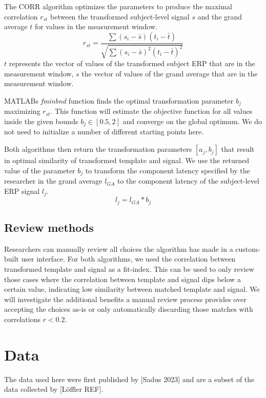 \documentclass[
  man,floatsintext]{apa7}
\begin{document}
The CORR algorithm optimizes the parameters to produce the maximal correlation \(r_{st}\) between the transformed subject-level signal \(s\) and the grand average \(t\) for values in the measurement window.
\[r_{st} = \frac{\sum(s_i - \bar{s})(t_{i} - \bar{t})}{\sqrt{\sum(s_i - \bar{s})^2(t_{i} - \bar{t})^2}}\]
\(t\) represents the vector of values of the transformed subject ERP that are in the measurement window, \(s\) the vector of values of the grand average that are in the measurement window.

MATLABs \emph{fminbnd} function finds the optimal transformation parameter \(b_j\) maximizing \(r_{st}\). This function will estimate the objective function for all values inside the given bounds \(b_j \in [0.5, 2]\) and converge on the global optimum. We do not need to initialize a number of different starting points here.

Both algorithms then return the transformation parameters \([a_j, b_j]\) that result in optimal similarity of transformed template and signal. We use the returned value of the parameter \(b_j\) to transform the component latency specified by the researcher in the grand average \(l_{GA}\) to the component latency of the subject-level ERP signal \(l_j\).
\[ l_j = l_{GA} * b_j \]

\hypertarget{review-methods}{%
\subsection{Review methods}\label{review-methods}}

Researchers can manually review all choices the algorithm has made in a custom-built user interface. For both algorithms, we used the correlation between transformed template and signal as a fit-index. This can be used to only review those cases where the correlation between template and signal dips below a certain value, indicating low similarity between matched template and signal. We will investigate the additional benefits a manual review process provides over accepting the choices as-is or only automatically discarding those matches with correlations \(r < 0.2\).

\hypertarget{data}{%
\section{Data}\label{data}}

The data used here were first published by {[}Sadus 2023{]} and are a subset of the data collected by {[}Löffler REF{]}.
\end{document}

